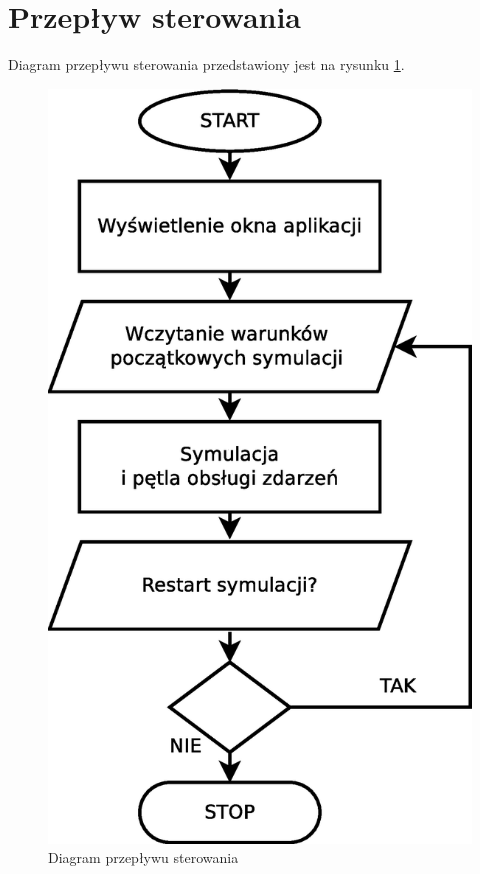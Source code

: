 
\section{Przepływ sterowania}
Diagram przepływu sterowania przedstawiony jest na rysunku \ref{fig:diagram_przeplywu_gui}.

\begin{figure}[H]
 \begin{center} 
  \includegraphics[scale=.4]{rysunki/diagram_przeplywu_sterowania}
 \end{center}
 \caption{Diagram przepływu sterowania}
 \label{fig:diagram_przeplywu_gui} 
\end{figure}   